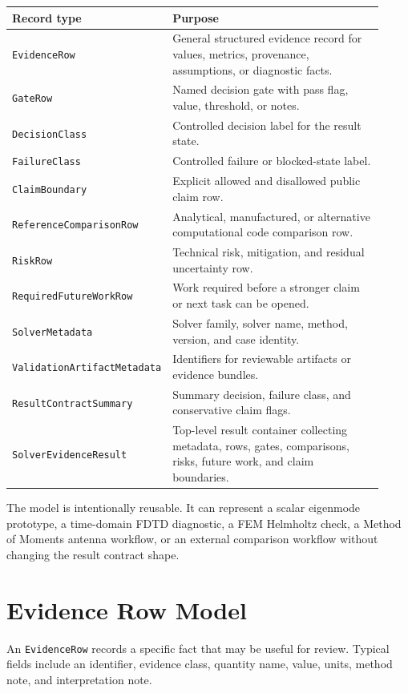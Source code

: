 \documentclass[11pt,a4paper]{article}
\newcommand{\code}[1]{\texttt{#1}}
\begin{document}
\begin{longtable}{p{0.30\linewidth}p{0.62\linewidth}}
\toprule
\textbf{Record type} & \textbf{Purpose}\\
\midrule
\endhead
\code{EvidenceRow} & General structured evidence record for values, metrics, provenance, assumptions, or diagnostic facts.\\
\code{GateRow} & Named decision gate with pass flag, value, threshold, or notes.\\
\code{DecisionClass} & Controlled decision label for the result state.\\
\code{FailureClass} & Controlled failure or blocked-state label.\\
\code{ClaimBoundary} & Explicit allowed and disallowed public claim row.\\
\code{ReferenceComparisonRow} & Analytical, manufactured, or alternative computational code comparison row.\\
\code{RiskRow} & Technical risk, mitigation, and residual uncertainty row.\\
\code{RequiredFutureWorkRow} & Work required before a stronger claim or next task can be opened.\\
\code{SolverMetadata} & Solver family, solver name, method, version, and case identity.\\
\code{ValidationArtifactMetadata} & Identifiers for reviewable artifacts or evidence bundles.\\
\code{ResultContractSummary} & Summary decision, failure class, and conservative claim flags.\\
\code{SolverEvidenceResult} & Top-level result container collecting metadata, rows, gates, comparisons, risks, future work, and claim boundaries.\\
\bottomrule
\end{longtable}

The model is intentionally reusable. It can represent a scalar eigenmode prototype, a time-domain FDTD diagnostic, a FEM Helmholtz check, a Method of Moments antenna workflow, or an external comparison workflow without changing the result contract shape.

\section{Evidence Row Model}
\label{sec:evidence-row-model}

An \code{EvidenceRow} records a specific fact that may be useful for review. Typical fields include an identifier, evidence class, quantity name, value, units, method note, and interpretation note.
\end{document}
